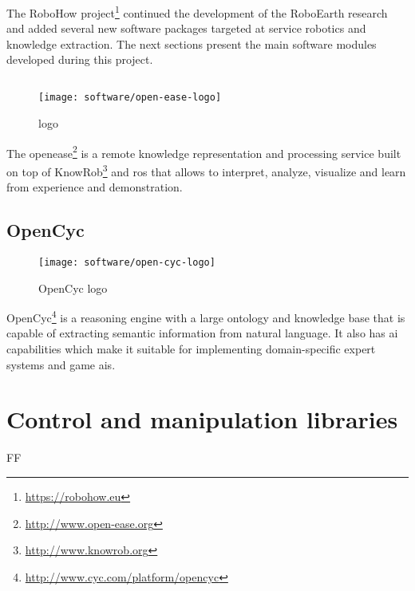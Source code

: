 The RoboHow project\footnote{\url{https://robohow.eu}} continued the development of the RoboEarth research and added several new software packages targeted at service robotics and knowledge extraction. The next sections present the main software modules developed during this project.


\subsection{}

\begin{wrapfigure}{r}{0.23\textwidth}
	\centering
	\vspace*{-2em}
	\texttt{[image: software/open-ease-logo]}
	\caption{ logo}
	\label{fig:open-ease}
\end{wrapfigure}

The \gls{openease}\footnote{\url{http://www.open-ease.org}} \cite{Beetz2015} is a remote knowledge representation and processing service built on top of KnowRob\footnote{\url{http://www.knowrob.org}} and \gls{ros} that allows to interpret, analyze, visualize and learn from experience and demonstration.


\subsection{OpenCyc}

\begin{wrapfigure}{r}{0.23\textwidth}
	\centering
	\vspace*{-2em}
	\texttt{[image: software/open-cyc-logo]}
	\caption{OpenCyc logo}
	\label{fig:open-cyc}
\end{wrapfigure}

OpenCyc\footnote{\url{http://www.cyc.com/platform/opencyc}} is a reasoning engine with a large ontology and knowledge base that is capable of extracting semantic information from natural language. It also has \gls{ai} capabilities which make it suitable for implementing domain-specific expert systems and game \glspl{ai}.




\section{Control and manipulation libraries}

FF


